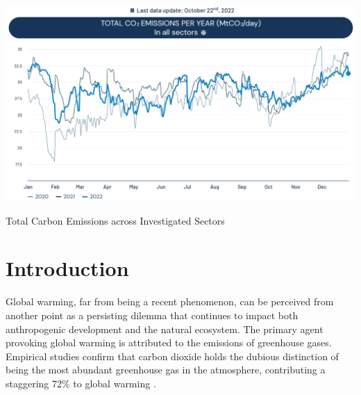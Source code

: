 \documentclass[sigconf, authordraft]{acmart}
\begin{document}

\begin{teaserfigure}
	\includegraphics[width=\textwidth]{figures/total_carbon_emissions.png}
	\caption{Total Carbon Emissions across Investigated Sectors}
	\Description{} \label{fig:teaser}
\end{teaserfigure}

\maketitle


\section{Introduction}
Global warming, far from being a recent phenomenon, can be perceived from another
point as a persisting dilemma that continues to impact both anthropogenic development
and the natural ecosystem. The primary agent provoking global warming is
attributed to the emissions of greenhouse gases. Empirical studies confirm that
carbon dioxide holds the dubious distinction of being the most abundant greenhouse
gas in the atmosphere, contributing a staggering 72\% to global warming \cite{li2021-pricing}.
\end{document}
